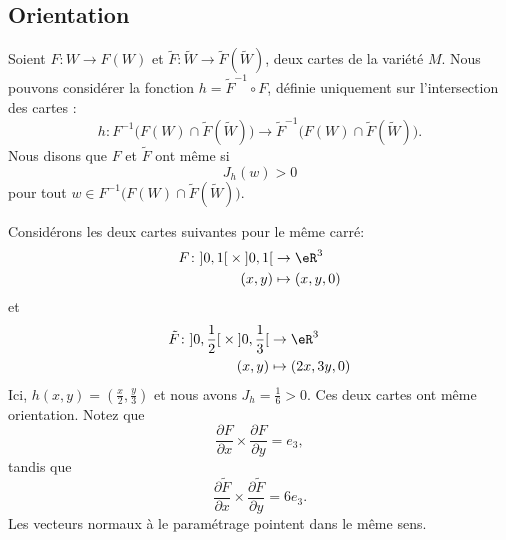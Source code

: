 \subsection{Orientation}

Soient \( F\colon W\to F(W)\) et \( \tilde F\colon \tilde W\to \tilde F(\tilde W)\), deux cartes de la variété \( M\). Nous pouvons considérer la fonction \( h=\tilde F^{-1}\circ F\), définie uniquement sur l'intersection des cartes :
\begin{equation}
	h\colon F^{-1}\big( F(W)\cap\tilde F(\tilde W) \big)\to \tilde F^{-1}\big( F(W)\cap\tilde F(\tilde W) \big).
\end{equation}
Nous disons que \( F\) et \( \tilde F\) ont même  si
\begin{equation}
	J_h(w)>0
\end{equation}
pour tout \( w\in  F^{-1}\big( F(W)\cap\tilde F(\tilde W) \big)\).

Considérons les deux cartes suivantes pour le même carré:
\begin{equation}
	\begin{aligned}
		F\colon\mathopen] 0 , 1 \mathclose[\times \mathopen] 0 , 1 \mathclose[ & \to \eR^3       \\
		(x,y)                                                                  & \mapsto (x,y,0)
	\end{aligned}
\end{equation}
et
\begin{equation}
	\begin{aligned}
		\tilde F\colon\mathopen] 0 , \frac{ 1 }{2} \mathclose[\times\mathopen] 0 , \frac{1}{ 3 } \mathclose[ & \to \eR^3         \\
		(x,y)                                                                                                & \mapsto (2x,3y,0)
	\end{aligned}
\end{equation}
Ici, \( h(x,y)=\left( \frac{ x }{ 2 },\frac{ y }{ 3 } \right)\) et nous avons \( J_h=\frac{1}{ 6 }>0\). Ces deux cartes ont même orientation. Notez que
\begin{equation}
	\frac{ \partial F }{ \partial x }\times\frac{ \partial F }{ \partial y }=e_3,
\end{equation}
tandis que
\begin{equation}
	\frac{ \partial \tilde F }{ \partial x }\times\frac{ \partial \tilde F }{ \partial y }=6e_3.
\end{equation}
Les vecteurs normaux à le paramétrage pointent dans le même sens.

